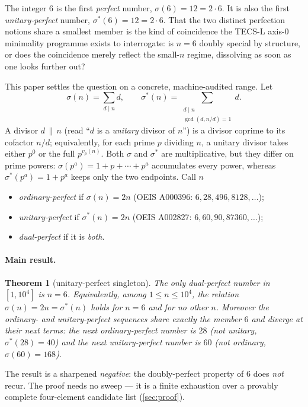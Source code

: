 \documentclass[11pt,a4paper]{article}
\newcommand{\sig}{\sigma}
\newcommand{\sigs}{\sigma^{*}}
\theoremstyle{plain}
\newtheorem{theorem}{Theorem}
\theoremstyle{definition}
\begin{document}
The integer $6$ is the first \emph{perfect} number, $\sig(6)=12=2\cdot6$. It is
also the first \emph{unitary-perfect} number, $\sigs(6)=12=2\cdot6$. That the
two distinct perfection notions share a smallest member is the kind of
coincidence the TECS-L axis-0 minimality programme exists to interrogate: is
$n=6$ doubly special by structure, or does the coincidence merely reflect the
small-$n$ regime, dissolving as soon as one looks further out?

This paper settles the question on a concrete, machine-audited range. Let
\begin{equation}
  \sig(n)=\sum_{d\mid n}d,
  \qquad
  \sigs(n)=\sum_{\substack{d\mid n\\ \gcd(d,n/d)=1}} d .
  \label{eq:defs}
\end{equation}
A divisor $d\,\|\,n$ (read ``$d$ is a \emph{unitary} divisor of $n$'') is a
divisor coprime to its cofactor $n/d$; equivalently, for each prime $p$ dividing
$n$, a unitary divisor takes either $p^0$ or the full $p^{v_p(n)}$. Both $\sig$
and $\sigs$ are multiplicative, but they differ on prime powers:
$\sig(p^a)=1+p+\cdots+p^a$ accumulates every power, whereas
$\sigs(p^a)=1+p^a$ keeps only the two endpoints. Call $n$
\begin{itemize}\itemsep0.15em
\item \emph{ordinary-perfect} if $\sig(n)=2n$ \quad (OEIS A000396: $6,28,496,8128,\dots$);
\item \emph{unitary-perfect} if $\sigs(n)=2n$ \quad (OEIS A002827: $6,60,90,87360,\dots$);
\item \emph{dual-perfect} if it is \emph{both}.
\end{itemize}

\paragraph{Main result.}
\begin{theorem}[unitary-perfect singleton]
\label{thm:main}
The only dual-perfect number in $[1,10^4]$ is $n=6$. Equivalently, among
$1\le n\le10^4$, the relation $\sig(n)=2n=\sigs(n)$ holds for $n=6$ and for no
other $n$. Moreover the ordinary- and unitary-perfect sequences share exactly
the member $6$ and \emph{diverge} at their next terms: the next ordinary-perfect
number is $28$ (not unitary, $\sigs(28)=40$) and the next unitary-perfect number
is $60$ (not ordinary, $\sig(60)=168$).
\end{theorem}

\noindent The result is a sharpened \emph{negative}: the doubly-perfect property
of $6$ does \emph{not} recur. The proof needs no sweep --- it is a finite
exhaustion over a provably complete four-element candidate list
(\textsection\ref{sec:proof}).
\end{document}
